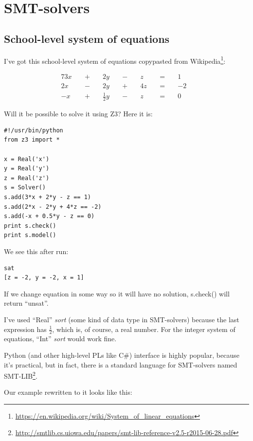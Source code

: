 \section{\ac{SMT}-solvers}

\subsection{School-level system of equations}

I've got this school-level system of equations copypasted from Wikipedia\footnote{\url{https://en.wikipedia.org/wiki/System_of_linear_equations}}:

\begin{alignat*}{7}
3x &&\; + \;&& 2y             &&\; - \;&& z  &&\; = \;&& 1 & \\
2x &&\; - \;&& 2y             &&\; + \;&& 4z &&\; = \;&& -2 & \\
-x &&\; + \;&& \tfrac{1}{2} y &&\; - \;&& z  &&\; = \;&& 0 &
\end{alignat*}

Will it be possible to solve it using Z3? Here it is:

\begin{lstlisting}
#!/usr/bin/python
from z3 import *

x = Real('x')
y = Real('y')
z = Real('z')
s = Solver()
s.add(3*x + 2*y - z == 1)
s.add(2*x - 2*y + 4*z == -2)
s.add(-x + 0.5*y - z == 0)
print s.check()
print s.model()
\end{lstlisting}

We see this after run:

\begin{lstlisting}
sat
[z = -2, y = -2, x = 1]
\end{lstlisting}

If we change equation in some way so it will have no solution, s.check() will return ``unsat''.

I've used ``Real'' \textit{sort} (some kind of data type in \ac{SMT}-solvers) because the last expression has $\frac{1}{2}$, which is, of course, a real number.
For the integer system of equations, ``Int'' \textit{sort} would work fine.

Python (and other high-level PLs like C\#) interface is highly popular, because it's practical, but in fact, 
there is a standard language for \ac{SMT}-solvers named SMT-LIB\footnote{\url{http://smtlib.cs.uiowa.edu/papers/smt-lib-reference-v2.5-r2015-06-28.pdf}}.

Our example rewritten to it looks like this:


